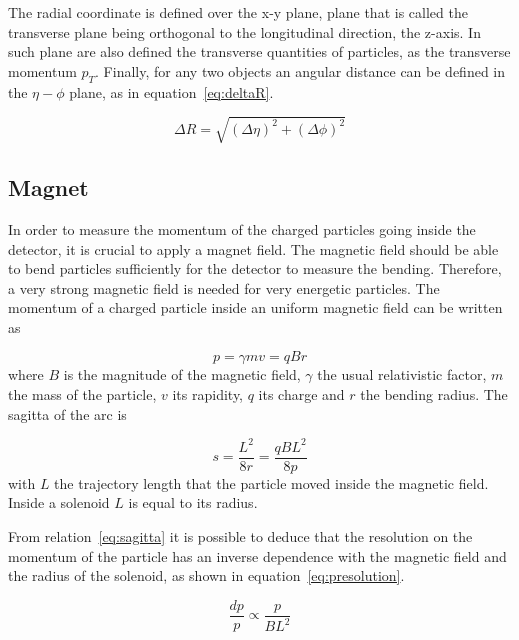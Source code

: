 The radial coordinate is defined over the x-y plane, plane that is called the transverse plane being orthogonal to the longitudinal direction, the z-axis. In such plane are also defined the transverse quantities of particles, as the transverse momentum $p_{T}$. Finally, for any two objects an angular distance can be defined in the $\eta-\phi$ plane, as in equation~\ref{eq:deltaR}.

\begin{equation}
  \label{eq:deltaR}
  \Delta R=\sqrt{(\Delta\eta)^{2}+(\Delta\phi)^{2}}
\end{equation}

\subsection{Magnet}
\label{sec:magnet}

In order to measure the momentum of the charged particles going inside the detector, it is crucial to apply a magnet field. The magnetic field should be able to bend particles sufficiently for the detector to measure the bending. Therefore, a very strong magnetic field is needed for very energetic particles. The momentum of a charged particle inside an uniform magnetic field can be written as

\begin{equation}
  \label{eq:momB}
  p=\gamma m v=qBr
\end{equation} where $B$ is the magnitude of the magnetic field, $\gamma$ the usual relativistic factor, $m$ the mass of the particle, $v$ its rapidity, $q$ its charge and $r$ the bending radius. The sagitta of the arc is

\begin{equation}
  \label{eq:sagitta}
  s=\frac{L^{2}}{8r}=\frac{qBL^{2}}{8p}
\end{equation} with $L$ the trajectory length that the particle moved inside the magnetic field. Inside a solenoid $L$ is equal to its radius. 

From relation~\ref{eq:sagitta} it is possible to deduce that the resolution on the momentum of the particle has an inverse dependence with the magnetic field and the radius of the solenoid, as shown in equation~\ref{eq:presolution}. %

\begin{equation}
  \label{eq:presolution}
  \frac{dp}{p}\propto \frac{p}{BL^{2}}
\end{equation}

